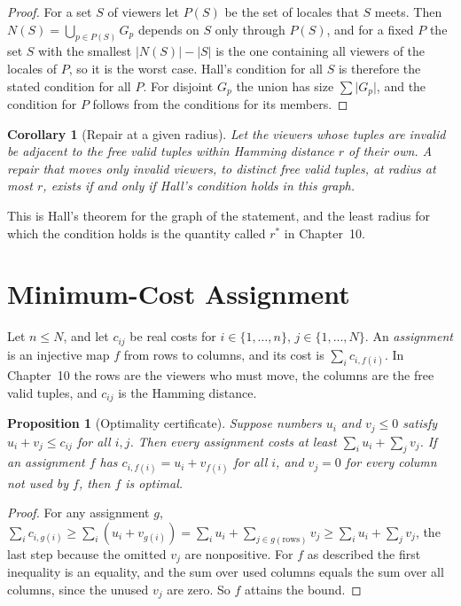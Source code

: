 \documentclass[11pt,twoside,openright]{book}
\theoremstyle{plain}
\newtheorem{proposition}[theorem]{Proposition}
\newtheorem{corollary}[theorem]{Corollary}
\theoremstyle{definition}
\theoremstyle{remark}
\begin{document}
\begin{proof}
For a set $S$ of viewers let $P(S)$ be the set of locales that $S$ meets. Then $N(S)=\bigcup_{p\in P(S)}G_p$ depends on $S$ only through $P(S)$, and for a fixed $P$ the set $S$ with the smallest $\lvert N(S)\rvert-\lvert S\rvert$ is the one containing all viewers of the locales of $P$, so it is the worst case. Hall's condition for all $S$ is therefore the stated condition for all $P$. For disjoint $G_p$ the union has size $\sum\lvert G_p\rvert$, and the condition for $P$ follows from the conditions for its members.
\end{proof}

\begin{corollary}[Repair at a given radius]\label{cor:radiusapp}
Let the viewers whose tuples are invalid be adjacent to the free valid tuples within Hamming distance $r$ of their own. A repair that moves only invalid viewers, to distinct free valid tuples, at radius at most $r$, exists if and only if Hall's condition holds in this graph.
\end{corollary}

This is Hall's theorem for the graph of the statement, and the least radius for which the condition holds is the quantity called $r^*$ in Chapter~10.

\section{Minimum-Cost Assignment}\label{sec:assignapp}

Let $n\le N$, and let $c_{ij}$ be real costs for $i\in\{1,\dots,n\}$, $j\in\{1,\dots,N\}$. An \emph{assignment} is an injective map $f$ from rows to columns, and its cost is $\sum_ic_{i,f(i)}$. In Chapter~10 the rows are the viewers who must move, the columns are the free valid tuples, and $c_{ij}$ is the Hamming distance.

\begin{proposition}[Optimality certificate]\label{prop:certapp}
Suppose numbers $u_i$ and $v_j\le0$ satisfy $u_i+v_j\le c_{ij}$ for all $i,j$. Then every assignment costs at least $\sum_iu_i+\sum_jv_j$. If an assignment $f$ has $c_{i,f(i)}=u_i+v_{f(i)}$ for all $i$, and $v_j=0$ for every column not used by $f$, then $f$ is optimal.
\end{proposition}

\begin{proof}
For any assignment $g$, $\sum_ic_{i,g(i)}\ge\sum_i(u_i+v_{g(i)})=\sum_iu_i+\sum_{j\in g(\text{rows})}v_j\ge\sum_iu_i+\sum_jv_j$, the last step because the omitted $v_j$ are nonpositive. For $f$ as described the first inequality is an equality, and the sum over used columns equals the sum over all columns, since the unused $v_j$ are zero. So $f$ attains the bound.
\end{proof}
\end{document}
